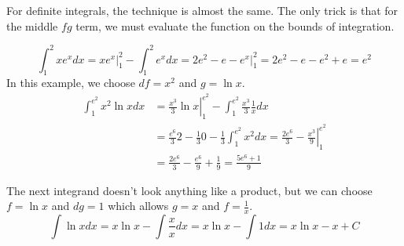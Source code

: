 \documentclass[fleqn]{report}
\begin{document}
For definite integrals, the technique is almost the same. The only
trick is that for the middle $fg$ term, we must evaluate the
function on the bounds of integration. 

\begin{example}
\begin{equation*}
\int_1^2 x e^x dx = \left. xe^x \right|_1^2 - \int_1^2 e^x dx =
2e^2 - e - \left. e^x \right|_1^2 = 2e^2 - e - e^2 + e = e^2
\end{equation*}
In this example, we choose $df =x^2$ and $g = \ln x$.
\begin{align*}
\int_1^{e^2} x^2 \ln x dx & = \left. \frac{x^3}{3} \ln x
\right|_1^{e^2} - \int_1^{e^2} \frac{x^3}{3} \frac{1}{x} dx \\
& = \frac{e^6}{3} 2 - \frac{1}{3} 0 - \frac{1}{3} \int_1^{e^2}
x^2 dx = \frac{2e^6}{3} - \left. \frac{x^3}{9} \right|_1^{e^2}
\\
& = \frac{2e^6}{3} - \frac{e^6}{9} + \frac{1}{9} = \frac{5e^6 +
1}{9} 
\end{align*}
\end{example}

\begin{example}
The next integrand
doesn't look anything like a product, but we can choose
$f = \ln x$ and $dg = 1$ which allows $g = x$ and $f =
\frac{1}{x}$. 
\begin{equation*}
\int \ln x dx = x \ln x - \int \frac{x}{x} dx = x \ln x - \int 1
dx = x \ln x - x + C
\end{equation*}
\end{example}
\end{document}
